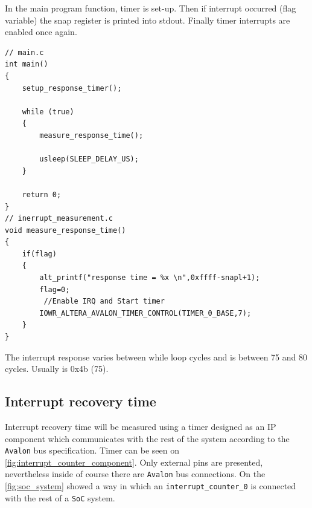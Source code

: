 In the main program function, timer is set-up. Then if interrupt occurred (flag variable) the snap register is printed into stdout. Finally timer interrupts are enabled once again.
\begin{lstlisting}[style=customc, frame=none]
// main.c
int main()
{
    setup_response_timer();

    while (true)
    {
        measure_response_time();
        
        usleep(SLEEP_DELAY_US);
    }
    
    return 0;
}
// inerrupt_measurement.c
void measure_response_time()
{
    if(flag)
    {
        alt_printf("response time = %x \n",0xffff-snapl+1);
        flag=0;
         //Enable IRQ and Start timer
        IOWR_ALTERA_AVALON_TIMER_CONTROL(TIMER_0_BASE,7);
    }
}
\end{lstlisting}
The interrupt response varies between while loop cycles and is between 75 and 80 cycles. Usually is 0x4b (75).

\subsection{Interrupt recovery time}
Interrupt recovery time will be measured using a timer designed as an IP component which communicates with the rest of the system according to the \verb|Avalon| bus specification. Timer can be seen on \figurename{} \ref{fig:interrupt_counter_component}. Only external pins are presented, nevertheless inside of course there are \verb|Avalon| bus connections. On the \figurename{} \ref{fig:soc_system} showed a way in which an \verb|interrupt_counter_0| is connected with the rest of a \verb|SoC| system.

